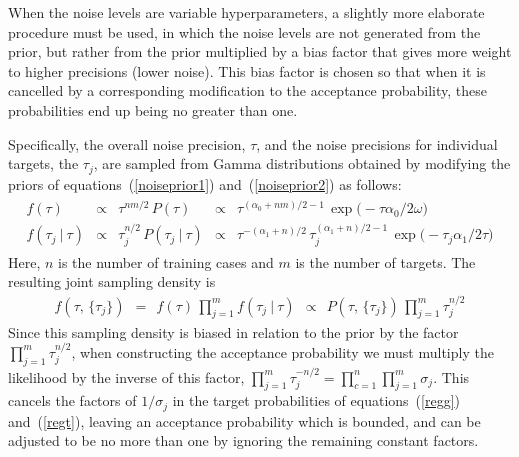 \documentclass{report}[11pt]
\def\beq{\begin{eqnarray}}
\def\eeq{\end{eqnarray}}
\begin{document}
When the noise levels are variable hyperparameters, a slightly more
elaborate procedure must be used, in which the noise levels are not
generated from the prior, but rather from the prior multiplied by a
bias factor that gives more weight to higher precisions (lower noise).
This bias factor is chosen so that when it is cancelled by a
corresponding modification to the acceptance probability, these
probabilities end up being no greater than one.

Specifically, the overall noise precision, $\tau$, and the noise
precisions for individual targets, the $\tau_j$, are sampled from
Gamma distributions obtained by modifying the priors of 
equations~(\ref{noiseprior1}) and~(\ref{noiseprior2}) as follows:\beq
\begin{array}{rcccl}
  f(\tau) &\propto&\tau^{nm/2}\, P(\tau) &\propto&
    \tau^{(\alpha_0+nm)/2-1}\, \exp \big(-\tau \alpha_{0} \big/ 2 \omega \big) 
  \\[3pt]
  f(\tau_j\ |\ \tau) &\propto& \tau_j^{n/2}\, P(\tau_j\ |\ \tau) &\propto&
    \tau^{-(\alpha_1+n)/2}\,
    \tau_j^{(\alpha_1+n)/2-1}\,
    \exp \big(-\tau_{j} \alpha_{1} \big/ 2 \tau \big)
\end{array}
\eeq%
Here, $n$ is the number of training cases and $m$ is the number of
targets.  The resulting joint sampling density is\vspace{-4pt}\beq
  f(\tau,\,\{\tau_j\}) \ \ =\ \ f(\tau)\,\prod_{j=1}^m f(\tau_j\ |\ \tau)
   \ \ \propto\ \ P(\tau,\,\{\tau_j\})\,\prod_{j=1}^m \tau_j^{n/2}
\eeq%
Since this sampling density is biased in relation to the prior by the
factor $\prod\limits_{j=1}^m \tau_j^{n/2}$, when constructing the
acceptance probability we must multiply the likelihood by the
inverse of this factor, $\prod\limits_{j=1}^m \tau_j^{-n/2} =
\prod\limits_{c=1}^n \prod\limits_{j=1}^m \sigma_j$.  This cancels the
factors of $1/\sigma_j$ in the target probabilities of
equations~(\ref{regg}) and~(\ref{regt}), leaving an acceptance probability
which is bounded, and can be adjusted to be no more than one by ignoring
the remaining constant factors.
\end{document}
